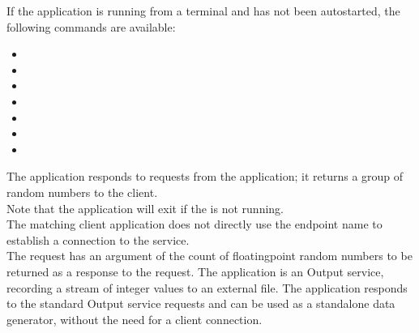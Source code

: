 If the application is running from a terminal and has not been autostarted, the following
commands are available:
\begin{itemize}
\item{}
\item\exSp{}
\item\exSp{}
\item\exSp{}
\item\exSp{}
\item\exSp{}
\item\exSp{}
\end{itemize}
The  application responds to
 requests from the
 application; it returns a group of random
numbers to the client.\\

Note that the application will exit if the
 is not running.\\

\insertAutoAppParameters{}
The matching client application does not directly use the endpoint name to establish a
connection to the service.\\

The  request has an argument of the
count of floating\longDash{}point random numbers to be returned as a response to the
request.
%
The  application is an Output
service, recording a stream of integer values to an external file.
The application responds to the standard Output service requests and can be used as a
standalone data generator, without the need for a client connection.\\

